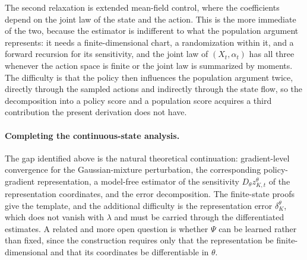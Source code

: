 The second relaxation is extended mean-field control, where the coefficients depend on the joint law of the state and the action. This is the more immediate of the two, because the estimator is indifferent to what the population argument represents: it needs a finite-dimensional chart, a randomization within it, and a forward recursion for its sensitivity, and the joint law of $(X_t,\alpha_t)$ has all three whenever the action space is finite or the joint law is summarized by moments. The difficulty is that the policy then influences the population argument twice, directly through the sampled actions and indirectly through the state flow, so the decomposition into a policy score and a population score acquires a third contribution the present derivation does not have.

\paragraph{Completing the continuous-state analysis.}
The gap identified above is the natural theoretical continuation: gradient-level convergence for the Gaussian-mixture perturbation, the corresponding policy-gradient representation, a model-free estimator of the sensitivity $D_\theta z_{K,t}^\theta$ of the representation coordinates, and the error decomposition. The finite-state proofs give the template, and the additional difficulty is the representation error $\delta_K^\theta$, which does not vanish with $\lambda$ and must be carried through the differentiated estimates. A related and more open question is whether $\Psi$ can be learned rather than fixed, since the construction requires only that the representation be finite-dimensional and that its coordinates be differentiable in $\theta$.

